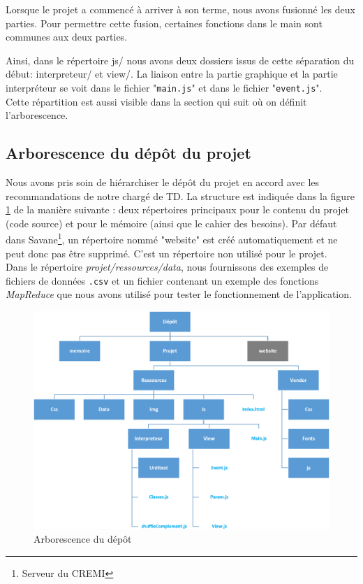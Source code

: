 Lorsque le projet a commencé à arriver à son terme, nous avons fusionné les deux parties. Pour permettre cette fusion, certaines fonctions dans le main sont communes aux deux parties.

Ainsi, dans le répertoire js/ nous avons deux dossiers issus de cette séparation du début: interpreteur/ et view/. La liaison entre la partie graphique et la partie interpréteur se voit dans le fichier "{\tt main.js}" et dans le fichier "{\tt event.js}".\\
Cette répartition est aussi visible dans la section qui suit où on définit l'arborescence.

\subsection*{Arborescence du dépôt du projet}%
Nous avons pris soin de hiérarchiser le dépôt du projet en accord avec les recommandations de notre chargé de TD. La structure est indiquée dans la figure \ref{fig:Arbo-depot} de la manière suivante : deux répertoires principaux pour le contenu du projet (code source) et pour le mémoire (ainsi que le cahier des besoins). Par défaut dans Savane\footnote{Serveur du CREMI}, un répertoire nommé "website" est créé automatiquement et ne peut donc pas être supprimé. C'est un répertoire non utilisé pour le projet.\\

Dans le répertoire {\it projet/ressources/data}, nous fournissons des exemples de fichiers de données {\tt .csv} et un fichier contenant un exemple des fonctions {\it MapReduce} que nous avons utilisé pour tester le fonctionnement de l'application.

\begin{figure}[H]
  \centering
    \includegraphics[width=1\textwidth]{images/arborescence.png}
        \caption{Arborescence du dépôt}
        \label{fig:Arbo-depot}
\end{figure}

